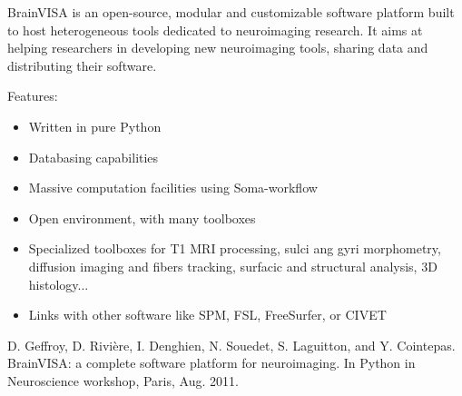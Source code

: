 \documentclass[a4paper,english]{article}
\begin{document}
BrainVISA is an open-source, modular and customizable software platform built
to host heterogeneous tools dedicated to neuroimaging research. It aims at
helping researchers in developing new neuroimaging tools, sharing data and
distributing their software.

Features:
%
\begin{itemize}

\item Written in pure Python

\item Databasing capabilities

\item Massive computation facilities using Soma-workflow

\item Open environment, with many toolboxes

\item Specialized toolboxes for T1 MRI processing, sulci ang gyri morphometry,
diffusion imaging and fibers tracking, surfacic and structural analysis,
3D histology...

\item Links with other software like SPM, FSL, FreeSurfer, or CIVET

\end{itemize}

D. Geffroy, D. Rivière, I. Denghien, N. Souedet, S. Laguitton, and
Y. Cointepas. BrainVISA: a complete software platform for neuroimaging.
In Python in Neuroscience workshop, Paris, Aug. 2011.
\begin{figure}
\noindent{}
\end{figure}
\end{document}
